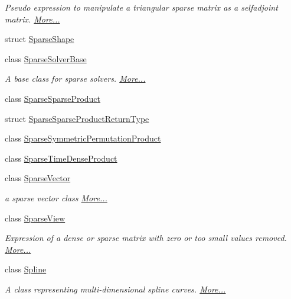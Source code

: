 \begin{DoxyCompactItemize}
\begin{DoxyCompactList}\small\item\em Pseudo expression to manipulate a triangular sparse matrix as a selfadjoint matrix.  \hyperlink{group___sparse_core___module_class_eigen_1_1_sparse_self_adjoint_view}{More...}\end{DoxyCompactList}\item 
struct \hyperlink{struct_eigen_1_1_sparse_shape}{Sparse\+Shape}
\item 
class \hyperlink{group___sparse_core___module_class_eigen_1_1_sparse_solver_base}{Sparse\+Solver\+Base}
\begin{DoxyCompactList}\small\item\em A base class for sparse solvers.  \hyperlink{group___sparse_core___module_class_eigen_1_1_sparse_solver_base}{More...}\end{DoxyCompactList}\item 
class \hyperlink{class_eigen_1_1_sparse_sparse_product}{Sparse\+Sparse\+Product}
\item 
struct \hyperlink{struct_eigen_1_1_sparse_sparse_product_return_type}{Sparse\+Sparse\+Product\+Return\+Type}
\item 
class \hyperlink{class_eigen_1_1_sparse_symmetric_permutation_product}{Sparse\+Symmetric\+Permutation\+Product}
\item 
class \hyperlink{class_eigen_1_1_sparse_time_dense_product}{Sparse\+Time\+Dense\+Product}
\item 
class \hyperlink{group___sparse_core___module_class_eigen_1_1_sparse_vector}{Sparse\+Vector}
\begin{DoxyCompactList}\small\item\em a sparse vector class  \hyperlink{group___sparse_core___module_class_eigen_1_1_sparse_vector}{More...}\end{DoxyCompactList}\item 
class \hyperlink{group___sparse_core___module_class_eigen_1_1_sparse_view}{Sparse\+View}
\begin{DoxyCompactList}\small\item\em Expression of a dense or sparse matrix with zero or too small values removed.  \hyperlink{group___sparse_core___module_class_eigen_1_1_sparse_view}{More...}\end{DoxyCompactList}\item 
class \hyperlink{group___splines___module_class_eigen_1_1_spline}{Spline}
\begin{DoxyCompactList}\small\item\em A class representing multi-\/dimensional spline curves.  \hyperlink{group___splines___module_class_eigen_1_1_spline}{More...}\end{DoxyCompactList}\item 

\end{DoxyCompactItemize}
